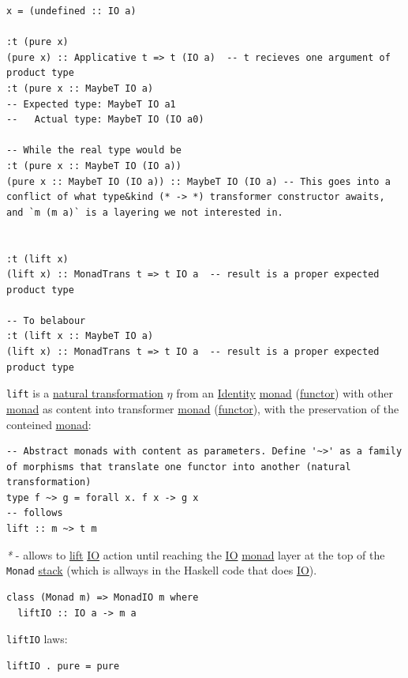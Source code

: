 \documentclass[a4paper,14pt,oneside]{book}
\begin{document}
{\begin{verbatim}
x = (undefined :: IO a)

:t (pure x)
(pure x) :: Applicative t => t (IO a)  -- t recieves one argument of product type
:t (pure x :: MaybeT IO a)
-- Expected type: MaybeT IO a1
--   Actual type: MaybeT IO (IO a0)

-- While the real type would be
:t (pure x :: MaybeT IO (IO a))
(pure x :: MaybeT IO (IO a)) :: MaybeT IO (IO a) -- This goes into a conflict of what type&kind (* -> *) transformer constructor awaits, and `m (m a)` is a layering we not interested in.


:t (lift x)
(lift x) :: MonadTrans t => t IO a  -- result is a proper expected product type

-- To belabour
:t (lift x :: MaybeT IO a)
(lift x) :: MonadTrans t => t IO a  -- result is a proper expected product type
\end{verbatim}

\texttt{lift} is a \hyperref[org640f3a4]{natural transformation} \(\eta\) from an \hyperref[org4f76d7c]{Identity} \hyperref[org90c21ab]{monad} (\hyperref[orgba8e41d]{functor}) with other \hyperref[org90c21ab]{monad} as content into transformer \hyperref[org90c21ab]{monad} (\hyperref[orgba8e41d]{functor}), with the preservation of the conteined \hyperref[org90c21ab]{monad}:\\
\begin{verbatim}
-- Abstract monads with content as parameters. Define '~>' as a family of morphisms that translate one functor into another (natural transformation)
type f ~> g = forall x. f x -> g x
-- follows
lift :: m ~> t m
\end{verbatim}

\label{sec:org56b9d38}
\emph{*} - allows to \hyperref[orga582c5d]{lift} \hyperref[orgd908175]{IO} action until reaching the \hyperref[orgd908175]{IO} \hyperref[org90c21ab]{monad} layer at the top of the \texttt{Monad} \hyperref[org507f473]{stack} (which is allways in the Haskell code that does \hyperref[orgd908175]{IO}).\\

\begin{verbatim}
class (Monad m) => MonadIO m where
  liftIO :: IO a -> m a
\end{verbatim}

\texttt{liftIO} laws:\\
\begin{verbatim}
liftIO . pure = pure


\end{verbatim}}
\end{document}
